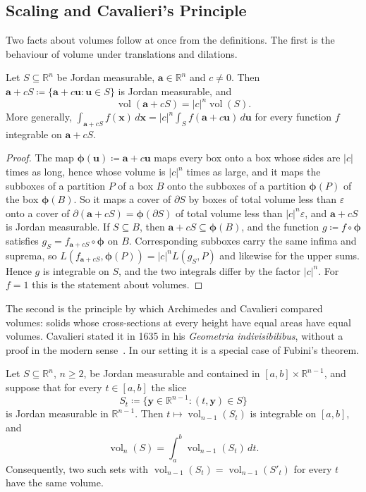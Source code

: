 \subsection{Scaling and Cavalieri's Principle}

Two facts about volumes follow at once from the definitions. The first is the behaviour of volume under translations and dilations.

\begin{proposition}
\label{prop:scaling}
Let $S\subseteq\mathbb R^n$ be Jordan measurable, $\mathbf a\in\mathbb R^n$ and $c\ne0$. Then $\mathbf a+cS\coloneqq\{\mathbf a+c\mathbf u: \mathbf u\in S\}$ is Jordan measurable, and
\[
\operatorname{vol}(\mathbf a+cS)=|c|^n\operatorname{vol}(S).
\]
More generally, $\int_{\mathbf a+cS}f(\mathbf x)\,d\mathbf x=|c|^n\int_Sf(\mathbf a+c\mathbf u)\,d\mathbf u$ for every function $f$ integrable on $\mathbf a+cS$.
\end{proposition}

\begin{proof}
The map $\boldsymbol\phi(\mathbf u)\coloneqq\mathbf a+c\mathbf u$ maps every box onto a box whose sides are $|c|$ times as long, hence whose volume is $|c|^n$ times as large, and it maps the subboxes of a partition $P$ of a box $B$ onto the subboxes of a partition $\boldsymbol\phi(P)$ of the box $\boldsymbol\phi(B)$. So it maps a cover of $\partial S$ by boxes of total volume less than $\varepsilon$ onto a cover of $\partial(\mathbf a+cS)=\boldsymbol\phi(\partial S)$ of total volume less than $|c|^n\varepsilon$, and $\mathbf a+cS$ is Jordan measurable. If $S\subseteq B$, then $\mathbf a+cS\subseteq\boldsymbol\phi(B)$, and the function $g\coloneqq f\circ\boldsymbol\phi$ satisfies $g_S=f_{\mathbf a+cS}\circ\boldsymbol\phi$ on $B$. Corresponding subboxes carry the same infima and suprema, so $L(f_{\mathbf a+cS},\boldsymbol\phi(P))=|c|^nL(g_S,P)$ and likewise for the upper sums. Hence $g$ is integrable on $S$, and the two integrals differ by the factor $|c|^n$. For $f=1$ this is the statement about volumes.
\end{proof}

The second is the principle by which Archimedes and Cavalieri compared volumes: solids whose cross-sections at every height have equal areas have equal volumes. Cavalieri stated it in 1635 in his \emph{Geometria indivisibilibus}, without a proof in the modern sense~\cite{edwards1979}. In our setting it is a special case of Fubini's theorem.

\begin{theorem}
\label{thm:cavalieri}
Let $S\subseteq\mathbb R^n$, $n\ge2$, be Jordan measurable and contained in $[a,b]\times\mathbb R^{n-1}$, and suppose that for every $t\in[a,b]$ the slice
\[
S_t\coloneqq\{\mathbf y\in\mathbb R^{n-1}: (t,\mathbf y)\in S\}
\]
is Jordan measurable in $\mathbb R^{n-1}$. Then $t\mapsto\operatorname{vol}_{n-1}(S_t)$ is integrable on $[a,b]$, and
\[
\operatorname{vol}_n(S)=\int_a^b\operatorname{vol}_{n-1}(S_t)\,dt .
\]
Consequently, two such sets with $\operatorname{vol}_{n-1}(S_t)=\operatorname{vol}_{n-1}(S'_t)$ for every $t$ have the same volume.
\end{theorem}

